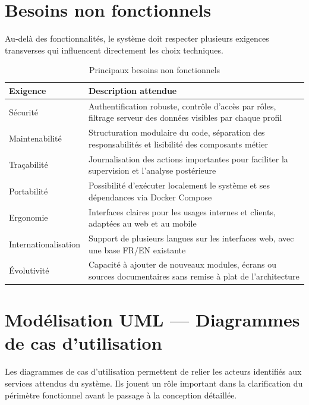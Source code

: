 \section{Besoins non fonctionnels}
Au-delà des fonctionnalités, le système doit respecter plusieurs exigences transverses qui influencent directement les choix techniques.

\begin{table}[H]
\centering
\caption{Principaux besoins non fonctionnels}
\label{tab:besoins_nf}
\begin{tabularx}{\textwidth}{|l|X|}
\hline
\textbf{Exigence} & \textbf{Description attendue} \\
\hline
Sécurité & Authentification robuste, contrôle d'accès par rôles, filtrage serveur des données visibles par chaque profil \\
\hline
Maintenabilité & Structuration modulaire du code, séparation des responsabilités et lisibilité des composants métier \\
\hline
Traçabilité & Journalisation des actions importantes pour faciliter la supervision et l'analyse postérieure \\
\hline
Portabilité & Possibilité d'exécuter localement le système et ses dépendances via Docker Compose \\
\hline
Ergonomie & Interfaces claires pour les usages internes et clients, adaptées au web et au mobile \\
\hline
Internationalisation & Support de plusieurs langues sur les interfaces web, avec une base FR/EN existante \\
\hline
Évolutivité & Capacité à ajouter de nouveaux modules, écrans ou sources documentaires sans remise à plat de l'architecture \\
\hline
\end{tabularx}
\end{table}

\section{Modélisation UML --- Diagrammes de cas d'utilisation}
Les diagrammes de cas d'utilisation permettent de relier les acteurs identifiés aux services attendus du système. Ils jouent un rôle important dans la clarification du périmètre fonctionnel avant le passage à la conception détaillée.

